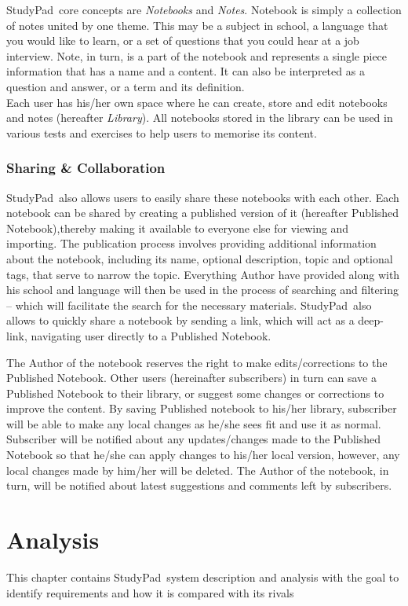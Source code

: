 \documentclass[thesis=B,english]{FITthesis}[2012/10/20]
\newcommand{\appname}{StudyPad}
\begin{document}
\appname\ core concepts are \textit{Notebooks} and \textit{Notes}. Notebook is simply a collection of notes united by one theme. This may be a subject in school, a language that you would like to learn, or a set of questions that you could hear at a job interview. Note, in turn, is a part of the notebook and represents a single piece information that has a name and a content. It can also be interpreted as a question and answer, or a term and its definition.
\\

Each user has his/her own space where he can create, store and edit notebooks and notes (hereafter \textit{Library}). All notebooks stored in the library can be used in various tests and exercises to help users to memorise its content.
\subsection{Sharing \& Collaboration}
\appname\ also allows users to easily share these notebooks with each other. Each notebook can be shared by creating a published version of it (hereafter Published Notebook),thereby making it available to everyone else for viewing and importing.
The publication process involves providing additional information about the notebook, including its name, optional description, topic and optional tags, that serve to narrow the topic. Everything Author have provided along with his school and language will then be used in the process of searching and filtering -- which will facilitate the search for the necessary materials. \appname\ also allows to quickly share a notebook by sending a link, which will act as a deep-link, navigating user directly to a Published Notebook.

The Author of the notebook reserves the right to make edits/corrections to the Published Notebook. Other users (hereinafter subscribers) in turn can save a Published Notebook to their library, or suggest some changes or corrections to improve the content. By saving Published notebook to his/her library, subscriber will be able to make any local changes as he/she sees fit and use it as normal. Subscriber will be notified about any updates/changes made to the Published Notebook so that he/she can apply changes to his/her local version, however, any local changes made by him/her will be deleted. The Author of the notebook, in turn, will be notified about latest suggestions and comments left by  subscribers.

\chapter{Analysis}
This chapter contains \appname\ system description and analysis with the goal to identify requirements and how it is compared with its rivals
\end{document}
